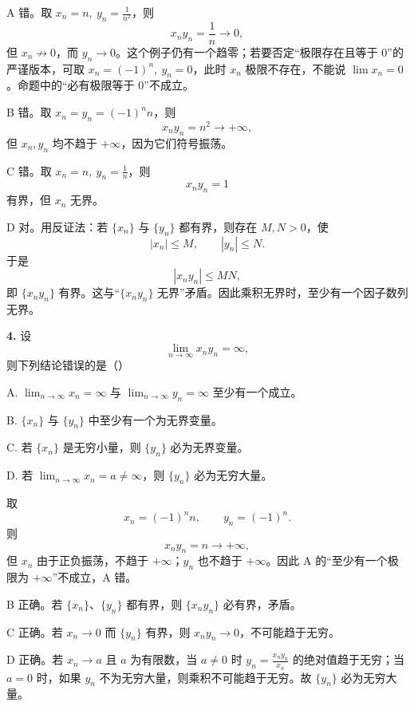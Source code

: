 \begin{solutionblock}

A 错。取 \(x_n=n,\ y_n=\frac1{n^2}\)，则
\[
x_ny_n=\frac1n\to0,
\]
但 \(x_n\not\to0\)，而 \(y_n\to0\)。这个例子仍有一个趋零；若要否定“极限存在且等于 0”的严谨版本，可取 \(x_n=(-1)^n,\ y_n=0\)，此时 \(x_n\) 极限不存在，不能说 \(\lim x_n=0\)。命题中的“必有极限等于 0”不成立。

B 错。取 \(x_n=y_n=(-1)^n n\)，则
\[
x_ny_n=n^2\to+\infty,
\]
但 \(x_n,y_n\) 均不趋于 \(+\infty\)，因为它们符号振荡。

C 错。取 \(x_n=n,\ y_n=\frac1n\)，则
\[
x_ny_n=1
\]
有界，但 \(x_n\) 无界。

D 对。用反证法：若 \(\{x_n\}\) 与 \(\{y_n\}\) 都有界，则存在 \(M,N>0\)，使
\[
|x_n|\le M,\qquad |y_n|\le N.
\]
于是
\[
|x_ny_n|\le MN,
\]
即 \(\{x_ny_n\}\) 有界。这与“\(\{x_ny_n\}\) 无界”矛盾。因此乘积无界时，至少有一个因子数列无界。

\end{solutionblock}

\begin{problemblock}
\textbf{4.} 设
\[
\lim_{n\to\infty}x_ny_n=\infty,
\]
则下列结论错误的是（\quad）

A. \(\lim_{n\to\infty}x_n=\infty\) 与 \(\lim_{n\to\infty}y_n=\infty\) 至少有一个成立。

B. \(\{x_n\}\) 与 \(\{y_n\}\) 中至少有一个为无界变量。

C. 若 \(\{x_n\}\) 是无穷小量，则 \(\{y_n\}\) 必为无界变量。

D. 若 \(\lim_{n\to\infty}x_n=a\ne\infty\)，则 \(\{y_n\}\) 必为无穷大量。
\end{problemblock}

\begin{solutionblock}

取
\[
x_n=(-1)^n n,\qquad y_n=(-1)^n.
\]
则
\[
x_ny_n=n\to+\infty,
\]
但 \(x_n\) 由于正负振荡，不趋于 \(+\infty\)；\(y_n\) 也不趋于 \(+\infty\)。因此 A 的“至少有一个极限为 \(+\infty\)”不成立，A 错。

B 正确。若 \(\{x_n\}\)、\(\{y_n\}\) 都有界，则 \(\{x_ny_n\}\) 必有界，矛盾。

C 正确。若 \(x_n\to0\) 而 \(\{y_n\}\) 有界，则 \(x_ny_n\to0\)，不可能趋于无穷。

D 正确。若 \(x_n\to a\) 且 \(a\) 为有限数，当 \(a\ne0\) 时 \(y_n=\frac{x_ny_n}{x_n}\) 的绝对值趋于无穷；当 \(a=0\) 时，如果 \(y_n\) 不为无穷大量，则乘积不可能趋于无穷。故 \(\{y_n\}\) 必为无穷大量。

\end{solutionblock}

